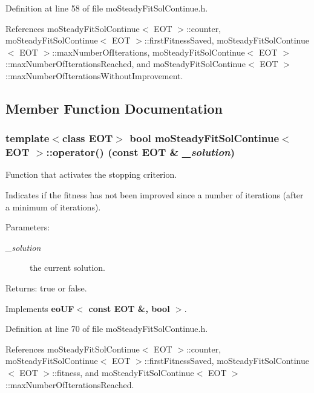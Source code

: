 Definition at line 58 of file mo\-Steady\-Fit\-Sol\-Continue.h.

References mo\-Steady\-Fit\-Sol\-Continue$<$ EOT $>$::counter, mo\-Steady\-Fit\-Sol\-Continue$<$ EOT $>$::first\-Fitness\-Saved, mo\-Steady\-Fit\-Sol\-Continue$<$ EOT $>$::max\-Number\-Of\-Iterations, mo\-Steady\-Fit\-Sol\-Continue$<$ EOT $>$::max\-Number\-Of\-Iterations\-Reached, and mo\-Steady\-Fit\-Sol\-Continue$<$ EOT $>$::max\-Number\-Of\-Iterations\-Without\-Improvement.

\subsection{Member Function Documentation}
\subsubsection{\setlength{\rightskip}{0pt plus 5cm}template$<$class EOT$>$ bool {\bf mo\-Steady\-Fit\-Sol\-Continue}$<$ EOT $>$::operator() (const EOT \& {\em \_\-solution})\hspace{0.3cm}{\tt  [inline, virtual]}}\label{classmo_steady_fit_sol_continue_a1}


Function that activates the stopping criterion. 

Indicates if the fitness has not been improved since a number of iterations (after a minimum of iterations).

\begin{Desc}
\item[Parameters:]
\begin{description}
\item[{\em \_\-solution}]the current solution. \end{description}
\end{Desc}
\begin{Desc}
\item[Returns:]true or false. \end{Desc}


Implements {\bf eo\-UF$<$ const EOT \&, bool $>$}.

Definition at line 70 of file mo\-Steady\-Fit\-Sol\-Continue.h.

References mo\-Steady\-Fit\-Sol\-Continue$<$ EOT $>$::counter, mo\-Steady\-Fit\-Sol\-Continue$<$ EOT $>$::first\-Fitness\-Saved, mo\-Steady\-Fit\-Sol\-Continue$<$ EOT $>$::fitness, and mo\-Steady\-Fit\-Sol\-Continue$<$ EOT $>$::max\-Number\-Of\-Iterations\-Reached.
